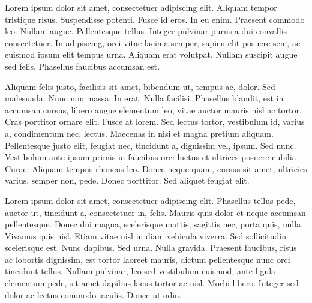 Lorem ipsum dolor sit amet, consectetuer adipiscing elit. Aliquam
tempor tristique risus. Suspendisse potenti. Fusce id eros. In eu
enim. Praesent commodo leo. Nullam augue. Pellentesque tellus. Integer
pulvinar purus a dui convallis consectetuer. In adipiscing, orci vitae
lacinia semper, sapien elit posuere sem, ac euismod ipsum elit tempus
urna. Aliquam erat volutpat. Nullam suscipit augue sed
felis. Phasellus faucibus accumsan est. 

Aliquam felis justo, facilisis sit amet, bibendum ut, tempus ac,
dolor. Sed malesuada. Nunc non massa. In erat. Nulla
facilisi. Phasellus blandit, est in accumsan cursus, libero augue
elementum leo, vitae auctor mauris nisl ac tortor. Cras porttitor
ornare elit. Fusce at lorem. Sed lectus tortor, vestibulum id, varius
a, condimentum nec, lectus. Maecenas in nisi et magna pretium
aliquam. Pellentesque justo elit, feugiat nec, tincidunt a, dignissim
vel, ipsum. Sed nunc. Vestibulum ante ipsum primis in faucibus orci
luctus et ultrices posuere cubilia Curae; Aliquam tempus rhoncus
leo. Donec neque quam, cursus sit amet, ultricies varius, semper non,
pede. Donec porttitor. Sed aliquet feugiat elit.  

\vspace*{12mm}

Lorem ipsum dolor sit amet, consectetuer adipiscing elit. Phasellus
tellus pede, auctor ut, tincidunt a, consectetuer in, felis. Mauris
quis dolor et neque accumsan pellentesque. Donec dui magna,
scelerisque mattis, sagittis nec, porta quis, nulla. Vivamus quis
nisl. Etiam vitae nisl in diam vehicula viverra. Sed sollicitudin
scelerisque est. Nunc dapibus. Sed urna. Nulla gravida. Praesent
faucibus, risus ac lobortis dignissim, est tortor laoreet mauris,
dictum pellentesque nunc orci tincidunt tellus. Nullam pulvinar, leo
sed vestibulum euismod, ante ligula elementum pede, sit amet dapibus
lacus tortor ac nisl. Morbi libero. Integer sed dolor ac lectus
commodo iaculis. Donec ut odio.  
